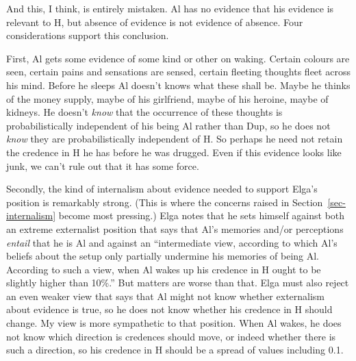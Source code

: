 \documentclass[
  10pt,
  letterpaper,
  DIV=11,
  numbers=noendperiod,
  twoside]{scrartcl}
\begin{document}
And this, I think, is entirely mistaken. Al has no evidence that his
evidence is relevant to H, but absence of evidence is not evidence of
absence. Four considerations support this conclusion.

First, Al gets some evidence of some kind or other on waking. Certain
colours are seen, certain pains and sensations are sensed, certain
fleeting thoughts fleet across his mind. Before he sleeps Al doesn't
knows what these shall be. Maybe he thinks of the money supply, maybe of
his girlfriend, maybe of his heroine, maybe of kidneys. He doesn't
\emph{know} that the occurrence of these thoughts is probabilistically
independent of his being Al rather than Dup, so he does not \emph{know}
they are probabilistically independent of H. So perhaps he need not
retain the credence in H he has before he was drugged. Even if this
evidence looks like junk, we can't rule out that it has some force.

Secondly, the kind of internalism about evidence needed to support
Elga's position is remarkably strong. (This is where the concerns raised
in Section~\ref{sec-internalism} become most pressing.) Elga notes that
he sets himself against both an extreme externalist position that says
that Al's memories and/or perceptions \emph{entail} that he is Al and
against an ``intermediate view, according to which Al's beliefs about
the setup only partially undermine his memories of being Al. According
to such a view, when Al wakes up his credence in H ought to be slightly
higher than 10\%.'' But matters are worse than that. Elga must also
reject an even weaker view that says that Al might not know whether
externalism about evidence is true, so he does not know whether his
credence in H should change. My view is more sympathetic to that
position. When Al wakes, he does not know which direction is credences
should move, or indeed whether there is such a direction, so his
credence in H should be a spread of values including 0.1.
\end{document}
